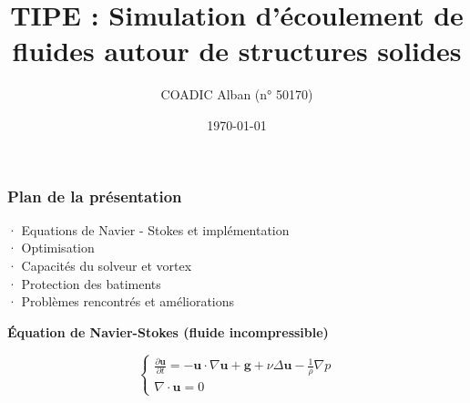 \documentclass{beamer}
\title{TIPE : Simulation d'écoulement de fluides autour de structures solides}
\author{COADIC Alban   (n° 50170)}
\date{\today}
\begin{document}
\begin{frame}
    \titlepage{}
\end{frame}

\begin{frame}
    \frametitle{Plan de la présentation}
    · Equations de Navier - Stokes et implémentation\\
    · Optimisation \\
    · Capacités du solveur et vortex\\
    · Protection des batiments\\
    · Problèmes rencontrés et améliorations\\
\end{frame}

\begin{frame}{}
    \begin{center}
    \textbf{Équation de Navier-Stokes (fluide incompressible)}
\end{center}

\vspace{-0.2cm}
\[
\left\{
\begin{array}{l}
    \displaystyle \frac{\partial \mathbf{u}}{\partial t} = -\mathbf{u} \cdot \nabla \mathbf{u} + \mathbf{g} + \nu \Delta \mathbf{u} - \frac{1}{\rho} \nabla p \\[2ex]
    \nabla \cdot \mathbf{u} = 0
\end{array}
\right.
\]
\end{frame}
\end{document}
